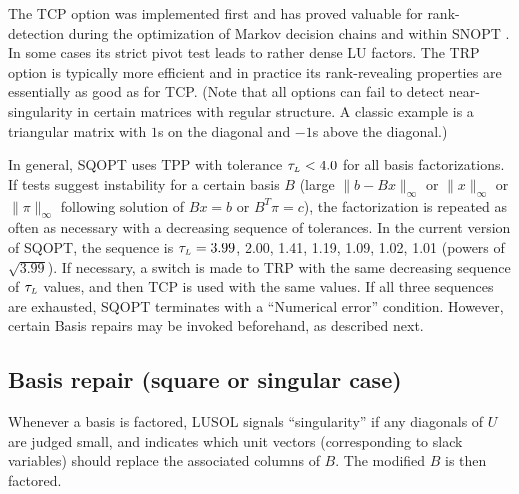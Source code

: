 \documentclass[draft,leqno,onefignum,onetabnum]{siamltex}
\def\norm#1{\|#1\|}
\def\T{^T\!}
\def\Lmax{\hbox{$\tau_{\scriptscriptstyle L}$}}  %
\def\LUSOL {{\small LUSOL}}
\def\SNOPT {{\small SNOPT}}
\def\SQOPT {{\small SQOPT}}
\newcommand{\infnorm}[1]{\norm{#1}_{\infty}}
\begin{document}
\smallskip

\noindent The TCP option was implemented first \cite{OSS2002SIAM}
and has proved valuable for rank-detection during the
optimization of Markov decision chains \cite{OS02}
and within \SNOPT{} \cite{GilMS02}.  In some cases its
strict pivot test leads to rather dense LU factors.
The TRP option is typically more efficient \cite{OSS2002HH}
and in practice its rank-revealing properties are essentially
as good as for TCP.  (Note that all options can fail to
detect near-singularity in certain matrices with regular structure.
A classic example is a triangular matrix with $1$s on the diagonal
and $-1$s above the diagonal.)

In general, \SQOPT{} uses TPP with tolerance
$\Lmax < 4.0$ for all basis factorizations.
If tests suggest instability for a certain basis $B$
(large $\infnorm{b - Bx}$ or $\infnorm{x}$ or $\infnorm{\pi}$ following
solution of $Bx = b$ or $B\T\pi = c$), the factorization
is repeated as often as necessary with a decreasing
sequence of tolerances.  In the current version of \SQOPT{},
the sequence is $\Lmax = 3.99$, 2.00, 1.41, 1.19, 1.09, 1.02, 1.01
(powers of $\sqrt{3.99}$).
If necessary, a switch is made to TRP with the same
decreasing sequence of $\Lmax$ values, and then
TCP is used with the same values.
If all three sequences are exhausted, \SQOPT{} terminates
with a ``Numerical error'' condition.
However, certain Basis repairs may be invoked beforehand,
as described next.




 \subsection{Basis repair (square or singular case)}    \label{sec-BRfac}

Whenever a basis is factored, \LUSOL{} signals ``singularity''
if any diagonals of $U$ are judged small,
and indicates which unit vectors (corresponding to slack variables)
should replace the associated columns of $B$.  The modified $B$ is
then factored.
%
%
\end{document}
